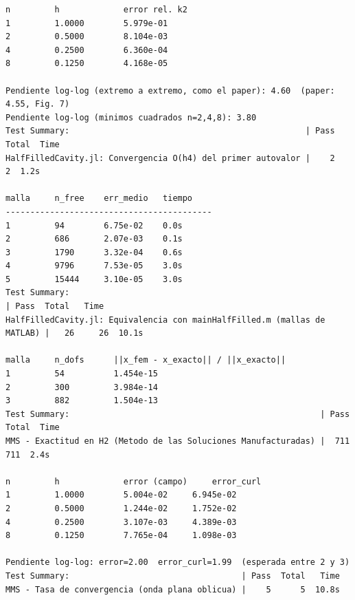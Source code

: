 \documentclass[12pt]{report} %
\begin{document}
\begin{lstlisting}[numbers=none, captionpos=b, caption={Salida completa de la suite de tests.}, label=cod:salida-tests]
n         h             error rel. k2
1         1.0000        5.979e-01
2         0.5000        8.104e-03
4         0.2500        6.360e-04
8         0.1250        4.168e-05

Pendiente log-log (extremo a extremo, como el paper): 4.60  (paper: 4.55, Fig. 7)
Pendiente log-log (minimos cuadrados n=2,4,8): 3.80
Test Summary:                                                | Pass  Total  Time
HalfFilledCavity.jl: Convergencia O(h4) del primer autovalor |    2      2  1.2s

malla     n_free    err_medio   tiempo
------------------------------------------
1         94        6.75e-02    0.0s
2         686       2.07e-03    0.1s
3         1790      3.32e-04    0.6s
4         9796      7.53e-05    3.0s
5         15444     3.10e-05    3.0s
Test Summary:                                                             | Pass  Total   Time
HalfFilledCavity.jl: Equivalencia con mainHalfFilled.m (mallas de MATLAB) |   26     26  10.1s

malla     n_dofs      ||x_fem - x_exacto|| / ||x_exacto||
1         54          1.454e-15
2         300         3.984e-14
3         882         1.504e-13
Test Summary:                                                   | Pass  Total  Time
MMS - Exactitud en H2 (Metodo de las Soluciones Manufacturadas) |  711    711  2.4s

n         h             error (campo)     error_curl
1         1.0000        5.004e-02     6.945e-02
2         0.5000        1.244e-02     1.752e-02
4         0.2500        3.107e-03     4.389e-03
8         0.1250        7.765e-04     1.098e-03

Pendiente log-log: error=2.00  error_curl=1.99  (esperada entre 2 y 3)
Test Summary:                                   | Pass  Total   Time
MMS - Tasa de convergencia (onda plana oblicua) |    5      5  10.8s
\end{lstlisting}
\end{document}
